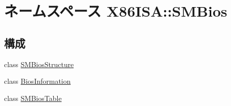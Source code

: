 \hypertarget{namespaceX86ISA_1_1SMBios}{
\section{ネームスペース X86ISA::SMBios}
\label{namespaceX86ISA_1_1SMBios}
}
\subsection*{構成}
\begin{DoxyCompactItemize}
\item 
class \hyperlink{classX86ISA_1_1SMBios_1_1SMBiosStructure}{SMBiosStructure}
\item 
class \hyperlink{classX86ISA_1_1SMBios_1_1BiosInformation}{BiosInformation}
\item 
class \hyperlink{classX86ISA_1_1SMBios_1_1SMBiosTable}{SMBiosTable}
\end{DoxyCompactItemize}
